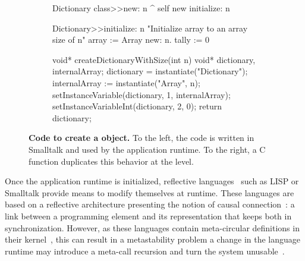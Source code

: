 \begin{figure}[ht]
\begin{subfigure}{.5\linewidth}
\begin{code}
Dictionary class>>new: n
    ^ self new initialize: n

Dictionary>>initialize: n
    "Initialize array to an array size of n"
    array := Array new: n.
    tally := 0
\end{code}
\end{subfigure}
\begin{subfigure}{.5\linewidth}
\begin{code}
void* createDictionaryWithSize(int n){
    void* dictionary, internalArray;
    dictionary = instantiate("Dictionary");
    internalArray := instantiate("Array", n);
    setInstanceVariable(dictionary, 1, internalArray);
    setInstanceVariableInt(dictionary, 2, 0);
    return dictionary;
}
\end{code}
\end{subfigure}
\caption{\textbf{Code to create a  object.} To the left, the code is written in Smalltalk and used by the application runtime. To the right, a C function duplicates this behavior at the \VM level.\label{code:logic_dup}}
\end{figure}



Once the application runtime is initialized, reflective languages~\cite{Smit84a} such as LISP or Smalltalk provide means to modify themselves at runtime. These languages are based on a reflective architecture presenting the notion of causal connection~\cite{Maes87a}: a link between a programming element and its representation that keeps both in synchronization. However, as these languages contain meta-circular definitions in their kernel~\cite{Chib96a}, this can result in a metastability problem \ie a change in the language runtime may introduce a meta-call recursion and turn the system unusable~\cite{Kicz91a}.%

